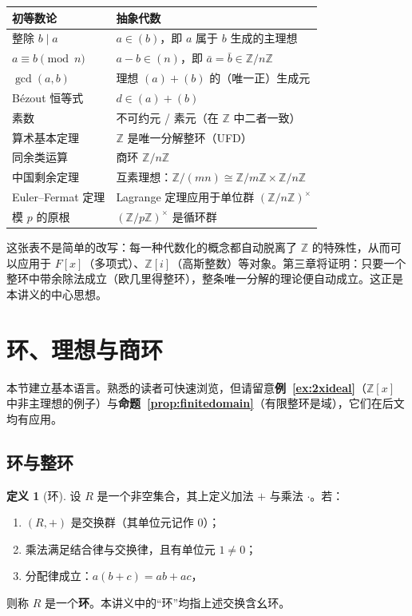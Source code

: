 \documentclass[a4paper,11pt]{ctexart}
\numberwithin{equation}{section}
\theoremstyle{plain}
\theoremstyle{definition}
\newtheorem{definition}[theorem]{定义}
\theoremstyle{remark}
\newcommand{\Z}{\mathbb{Z}}
\newcommand{\Ga}{\mathbb{Z}[i]}
\begin{document}
\begin{center}
\renewcommand{\arraystretch}{1.4}
\begin{tabular}{ll}
\hline
初等数论 & 抽象代数 \\
\hline
整除 $b \mid a$ & $a \in (b)$，即 $a$ 属于 $b$ 生成的主理想 \\
$a \equiv b \pmod n$ & $a-b\in (n)$，即 $\bar a=\bar b\in \Z/n\Z$ \\
$\gcd(a,b)$ & 理想 $(a)+(b)$ 的（唯一正）生成元 \\
Bézout 恒等式 & $d\in (a)+(b)$ \\
素数 & 不可约元 / 素元（在 $\Z$ 中二者一致） \\
算术基本定理 & $\Z$ 是唯一分解整环（UFD） \\
同余类运算 & 商环 $\Z/n\Z$ \\
中国剩余定理 & 互素理想：$\Z/(mn)\cong \Z/m\Z\times\Z/n\Z$ \\
Euler--Fermat 定理 & Lagrange 定理应用于单位群 $(\Z/n\Z)^\times$ \\
模 $p$ 的原根 & $(\Z/p\Z)^\times$ 是循环群 \\
\hline
\end{tabular}
\end{center}

这张表不是简单的改写：每一种代数化的概念都自动脱离了 $\Z$ 的特殊性，从而可以应用于 $F[x]$（多项式）、$\Ga$（高斯整数）等对象。第三章将证明：只要一个整环中带余除法成立（欧几里得整环），整条唯一分解的理论便自动成立。这正是本讲义的中心思想。

\newpage

\section{环、理想与商环}

本节建立基本语言。熟悉的读者可快速浏览，但请留意\textbf{例~\ref{ex:2xideal}}（$\Z[x]$ 中非主理想的例子）与\textbf{命题~\ref{prop:finitedomain}}（有限整环是域），它们在后文均有应用。

\subsection{环与整环}

\begin{definition}[环]\label{def:ring}
设 $R$ 是一个非空集合，其上定义加法 $+$ 与乘法 $\cdot$。若：
\begin{enumerate}[itemsep=0.1em]
  \item $(R,+)$ 是交换群（其单位元记作 $0$）；
  \item 乘法满足结合律与交换律，且有单位元 $1\neq 0$；
  \item 分配律成立：$a(b+c)=ab+ac$，
\end{enumerate}
则称 $R$ 是一个\textbf{环}。本讲义中的“环”均指上述交换含幺环。
\end{definition}
\end{document}
